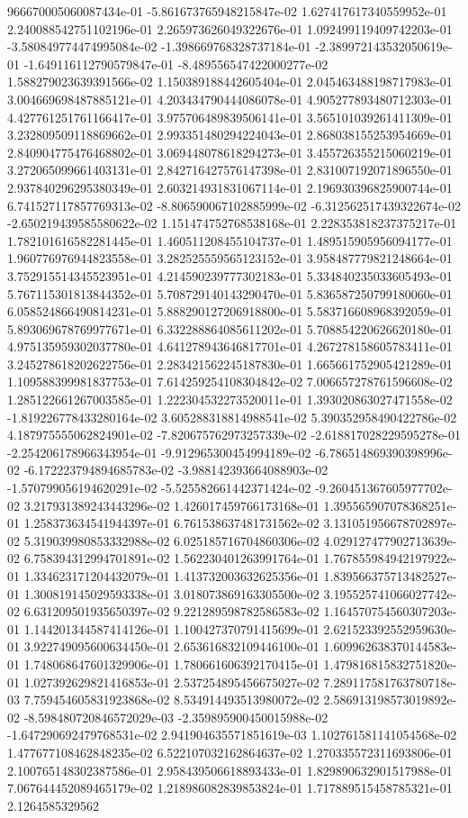 966670005060087434e-01	-5.861673765948215847e-02	1.627417617340559952e-01	2.240088542751102196e-01	2.265973626049322676e-01	1.092499119409742203e-01	-3.580849774474995084e-02	-1.398669768328737184e-01	-2.389972143532050619e-01	-1.649116112790579847e-01	-8.489556547422000277e-02	1.588279023639391566e-02	1.150389188442605404e-01	2.045463488198717983e-01	3.004669698487885121e-01	4.203434790444086078e-01	4.905277893480712303e-01	4.427761251761166417e-01	3.975706489839506141e-01	3.565101039261411309e-01	3.232809509118869662e-01	2.993351480294224043e-01	2.868038155253954669e-01	2.840904775476468802e-01	3.069448078618294273e-01	3.455726355215060219e-01	3.272065099661403131e-01	2.842716427576147398e-01	2.831007192071896550e-01	2.937840296295380349e-01	2.603214931831067114e-01	2.196930396825900744e-01	6.741527117857769313e-02	-8.806590067102885999e-02	-6.312562517439322674e-02	-2.650219439585580622e-02	1.151474752768538168e-01	2.228353818237375217e-01	1.782101616582281445e-01	1.460511208455104737e-01	1.489515905956094177e-01	1.960776976944823558e-01	3.282525559565123152e-01	3.958487779821248664e-01	3.752915514345523951e-01	4.214590239777302183e-01	5.334840235033605493e-01	5.767115301813844352e-01	5.708729140143290470e-01	5.836587250799180060e-01	6.058524866490814231e-01	5.888290127206918800e-01	5.583716608968392059e-01	5.893069678769977671e-01	6.332288864085611202e-01	5.708854220626620180e-01	4.975135959302037780e-01	4.641278943646817701e-01	4.267278158605783411e-01	3.245278618202622756e-01	2.283421562245187830e-01	1.665661752905421289e-01	1.109588399981837753e-01	7.614259254108304842e-02	7.006657278761596608e-02	1.285122661267003585e-01	1.222304532273520011e-01	1.393020863027471558e-02	-1.819226778433280164e-02	3.605288318814988541e-02	5.390352958490422786e-02	4.187975555062824901e-02	-7.820675762973257339e-02	-2.618817028229595278e-01	-2.254206178966343954e-01	-9.912965300454994189e-02	-6.786514869390398996e-02	-6.172223794894685783e-02	-3.988142393664088903e-02	-1.570799056194620291e-02	-5.525582661442371424e-02	-9.260451367605977702e-02	3.217931389243443296e-02	1.426017459766173168e-01	1.395565907078368251e-01	1.258373634541944397e-01	6.761538637481731562e-02	3.131051956678702897e-02	5.319039980853332988e-02	6.025185716704860306e-02	4.029127477902713639e-02	6.758394312994701891e-02	1.562230401263991764e-01	1.767855984942197922e-01	1.334623171204432079e-01	1.413732003632625356e-01	1.839566375713482527e-01	1.300819145029593338e-01	3.018073869163305500e-02	3.195525741066027742e-02	6.631209501935650397e-02	9.221289598782586583e-02	1.164570754560307203e-01	1.144201344587414126e-01	1.100427370791415699e-01	2.621523392552959630e-01	3.922749095600634450e-01	2.653616832109446100e-01	1.609962638370144583e-01	1.748068647601329906e-01	1.780661606392170415e-01	1.479816815832751820e-01	1.027392629821416853e-01	2.537254895456675027e-02	7.289117581763780718e-03	7.759454605831923868e-02	8.534914493513980072e-02	2.586913198573019892e-02	-8.598480720846572029e-03	-2.359895900450015988e-02	-1.647290692479768531e-02	2.941904635571851619e-03	1.102761581141054568e-02	1.477677108462848235e-02	6.522107032162864637e-02	1.270335572311693806e-01	2.100765148302387586e-01	2.958439506618893433e-01	1.829890632901517988e-01	7.067644452089465179e-02	1.218986082839853824e-01	1.717889515458785321e-01	2.1264585329562